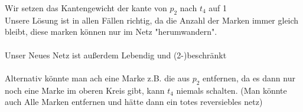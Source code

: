 Wir setzen das Kantengewicht der kante von $p_2$ nach $t_4$ auf 1\\
Unsere Lösung ist in allen Fällen richtig, da die Anzahl der Marken immer gleich bleibt, diese marken können nur im Netz "{}herumwandern"{}.\\
\\
Unser Neues Netz ist außerdem Lebendig und (2-)beschränkt\\
\\
Alternativ könnte man ach eine Marke z.B. die aus $p_2$ entfernen, da es dann nur noch eine Marke im oberen Kreis gibt, kann $t_4$ niemals schalten. (Man könnte auch Alle Marken entfernen und hätte dann ein totes reversiebles netz)
